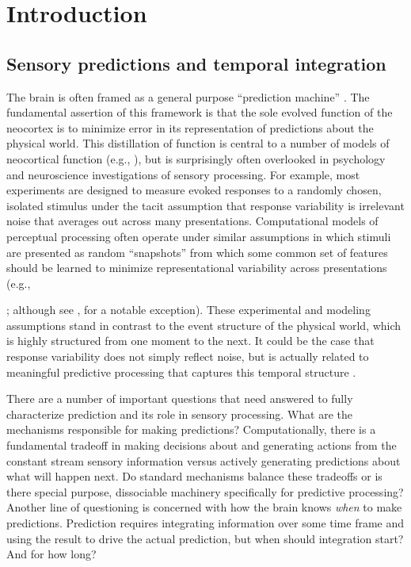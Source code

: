 \documentclass[dwyatte_dissertation.tex]{subfiles}
\begin{document}
\sloppy

\chapter{Introduction}
\label{chap:intro}

\section{Sensory predictions and temporal integration}
The brain is often framed as a general purpose ``prediction machine'' \cite{HawkinsBlakeslee04,Clark13}. The fundamental assertion of this framework is that the sole evolved function of the neocortex is to minimize error in its representation of predictions about the physical world. This distillation of function is central to a number of models of neocortical function (e.g., ), but is surprisingly often overlooked in psychology and neuroscience investigations of sensory processing. For example, most experiments are designed to measure evoked responses to a randomly chosen, isolated stimulus under the tacit assumption that response variability is irrelevant noise that averages out across many presentations. Computational models of perceptual processing often operate under similar assumptions in which stimuli are presented as random ``snapshots'' from which some common set of features should be learned to minimize representational variability across presentations (e.g., {; although see , for a notable exception). These experimental and modeling assumptions stand in contrast to the event structure of the physical world, which is highly structured from one moment to the next. It could be the case that response variability does not simply reflect noise, but is actually related to meaningful predictive processing that captures this temporal structure \cite{ArieliSterkinGrinvaldEtAl96,WilderJonesAhmedEtAl13,FischerWhitney14}.

There are a number of important questions that need answered to fully characterize prediction and its role in sensory processing. What are the mechanisms responsible for making predictions? Computationally, there is a fundamental tradeoff in making decisions about and generating actions from the constant stream sensory information versus actively generating predictions about what will happen next. Do standard mechanisms balance these tradeoffs or is there special purpose, dissociable machinery specifically for predictive processing? Another line of questioning is concerned with how the brain knows \textit{when} to make predictions. Prediction requires integrating information over some time frame and using the result to drive the actual prediction, but when should integration start? And for how long? 

}
\end{document}
